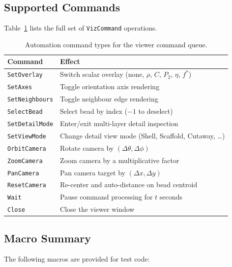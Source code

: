 \documentclass[11pt]{article}
\newcommand{\type}[1]{\texttt{#1}}
\newcommand{\fn}[1]{\texttt{#1}}
\begin{document}
\subsection{Supported Commands}

Table~\ref{tab:viz-commands} lists the full set of
\type{VizCommand} operations.

\begin{table}[h]
\centering
\caption{Automation command types for the viewer command queue.}
\label{tab:viz-commands}
\begin{tabular}{@{}lp{7cm}@{}}
\toprule
\textbf{Command} & \textbf{Effect} \\
\midrule
\fn{SetOverlay}      & Switch scalar overlay (none, $\rho$, $C$, $P_2$, $\eta$, $f^*$) \\
\fn{SetAxes}         & Toggle orientation axis rendering \\
\fn{SetNeighbours}   & Toggle neighbour edge rendering \\
\fn{SelectBead}      & Select bead by index ($-1$ to deselect) \\
\fn{SetDetailMode}   & Enter/exit multi-layer detail inspection \\
\fn{SetViewMode}     & Change detail view mode (Shell, Scaffold, Cutaway, \ldots) \\
\fn{OrbitCamera}     & Rotate camera by $(\Delta\theta, \Delta\phi)$ \\
\fn{ZoomCamera}      & Zoom camera by a multiplicative factor \\
\fn{PanCamera}       & Pan camera target by $(\Delta x, \Delta y)$ \\
\fn{ResetCamera}     & Re-center and auto-distance on bead centroid \\
\fn{Wait}            & Pause command processing for $t$ seconds \\
\fn{Close}           & Close the viewer window \\
\bottomrule
\end{tabular}
\end{table}

\subsection{Macro Summary}

The following macros are provided for test code:
\end{document}
